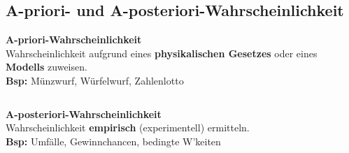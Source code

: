 		\vspace*{-0.8cm}\subsection{A-priori- und A-posteriori-Wahrscheinlichkeit }
			\begin{minipage}{0.49\textwidth}
				\textbf{A-priori-Wahrscheinlichkeit}\\[0.2cm]
				Wahrscheinlichkeit aufgrund eines \textbf{physikalischen Gesetzes} oder eines \textbf{Modells} zuweisen.\\
				\textbf{Bsp:} Münzwurf, Würfelwurf, Zahlenlotto
			\end{minipage}
			\begin{minipage}{0.02\textwidth}$ $\end{minipage}
			\begin{minipage}{0.49\textwidth}
				\textbf{A-posteriori-Wahrscheinlichkeit}\\[0.2cm]
				Wahrscheinlichkeit \textbf{empirisch} (experimentell) ermitteln.\\
				\textbf{Bsp:} Umfälle, Gewinnchancen, bedingte W'keiten
			\end{minipage}
	
